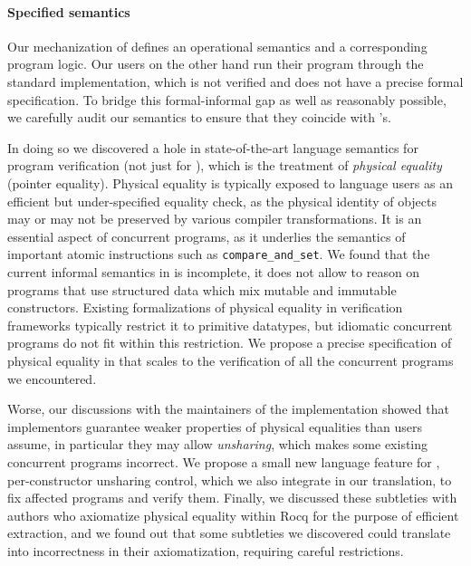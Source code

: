 \paragraph{Specified \OCaml semantics} Our \Iris mechanization of \ZooLang defines an operational semantics and a corresponding program logic. Our users on the other hand run their program through the standard \OCaml implementation, which is not verified and does not have a precise formal specification. To bridge this formal-informal gap as well as reasonably possible, we carefully audit our \ZooLang semantics to ensure that they coincide with \OCaml's.

In doing so we discovered a hole in state-of-the-art language semantics for program verification (not just for \OCaml), which is the treatment of \emph{physical equality} (pointer equality). Physical equality is typically exposed to language users as an efficient but under-specified equality check, as the physical identity of objects may or may not be preserved by various compiler transformations. It is an essential aspect of concurrent programs, as it underlies the semantics of important atomic instructions such as \texttt{compare\_and\_set}. We found that the current informal semantics in \OCaml is incomplete, it does not allow to reason on programs that use structured data which mix mutable and immutable constructors. Existing formalizations of physical equality in verification frameworks typically restrict it to primitive datatypes, but idiomatic concurrent programs do not fit within this restriction. We propose a precise specification of physical equality in \Zoo that scales to the verification of all the concurrent programs we encountered.

Worse, our discussions with the maintainers of the \OCaml implementation showed that implementors guarantee weaker properties of physical equalities than users assume, in particular they may allow \emph{unsharing}, which makes some existing concurrent programs incorrect. We propose a small new language feature for \OCaml, per-constructor unsharing control, which we also integrate in our \ZooLang translation, to fix affected programs and verify them. Finally, we discussed these subtleties with authors who axiomatize physical equality within Rocq for the purpose of efficient extraction, and we found out that some subtleties we discovered could translate into incorrectness in their axiomatization, requiring careful restrictions.

